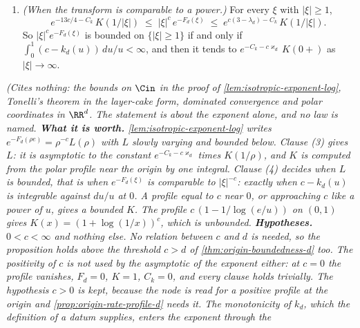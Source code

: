 \begin{proposition}
\begin{enumerate}
\[
  F_d(\rho e) - \bigl(c\log\rho - \log K(1/\rho) + C_k\bigr) \to c\,\varkappa_d ,
  \qquad\text{that is}\qquad
  \frac{e^{-F_d(\rho e)}}{e^{-C_k - c\varkappa_d}\,\rho^{-c}\,K(1/\rho)} \to 1 .
\]
Moreover, for every $\rho \ge 1$,
\[
  c\,(\lambda_d - 3) \;\le\; F_d(\rho e) - \bigl(c\log\rho - \log K(1/\rho) + C_k\bigr)
  \;\le\; \tfrac{13}{4}\,c .
\]
More generally, for every $\rho > 0$,
\[
  c\,(\lambda_d - 3) \;\le\; F_d(\rho e) - \int_{1/\rho}^{\infty}k_d(r)\,\frac{dr}{r}
  \;\le\; \tfrac{13}{4}\,c ,
\]
and for $\rho \ge 1$ the integral equals $c\log\rho - \log K(1/\rho) + C_k$.
\item \emph{(When the transform is comparable to a power.)} For every $\xi$ with $|\xi| \ge 1$,
\[
  e^{-13c/4 - C_k}\,K(1/|\xi|) \;\le\; |\xi|^{c}\,e^{-F_d(\xi)} \;\le\;
  e^{c(3-\lambda_d) - C_k}\,K(1/|\xi|) .
\]
So $|\xi|^{c}e^{-F_d(\xi)}$ is bounded on $\{|\xi| \ge 1\}$ if and only if
$\int_0^1 (c - k_d(u))\,du/u < \infty$, and then it tends to
$e^{-C_k - c\varkappa_d}\,K(0{+})$ as $|\xi| \to \infty$.
\end{enumerate}
\statusT\quad\emph{(Cites nothing: the bounds on $\Cin$ in the proof of
\ref{lem:isotropic-exponent-log}, Tonelli's theorem in the layer-cake form, dominated convergence
and polar coordinates in $\RR^d$. The statement is about the exponent alone, and no law is named.
\textbf{What it is worth.} \ref{lem:isotropic-exponent-log} writes
$e^{-F_d(\rho e)} = \rho^{-c}L(\rho)$ with $L$ slowly varying and bounded below. Clause (3) gives
$L$: it is asymptotic to the constant $e^{-C_k - c\varkappa_d}$ times $K(1/\rho)$, and $K$ is
computed from the polar profile near the origin by one integral. Clause (4) decides when $L$ is
bounded, that is when $e^{-F_d(\xi)}$ is comparable to $|\xi|^{-c}$: exactly when $c - k_d(u)$ is
integrable against $du/u$ at $0$. A profile equal to $c$ near $0$, or approaching $c$ like a power
of $u$, gives a bounded $K$. The profile $c\,(1 - 1/\log(e/u))$ on $(0,1)$ gives
$K(x) = (1 + \log(1/x))^{c}$, which is unbounded. \textbf{Hypotheses.} $0 < c < \infty$ and nothing
else. No relation between $c$ and $d$ is needed, so the proposition holds above the threshold
$c > d$ of \ref{thm:origin-boundedness-d} too. The positivity of $c$ is not used by the
asymptotic of the exponent either: at $c = 0$ the profile vanishes, $F_d = 0$, $K = 1$,
$C_k = 0$, and every clause holds trivially. The hypothesis $c > 0$ is kept, because the node is
read for a positive profile at the origin and \ref{prop:origin-rate-profile-d} needs it. The
monotonicity of $k_d$, which the definition of a datum supplies, enters the exponent through the
}
\end{proposition}

